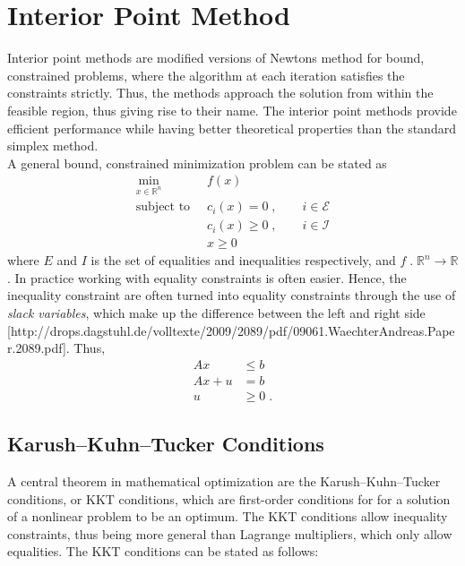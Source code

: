 \chapter{Interior Point Method}
Interior point methods are modified versions of Newtons method for bound, constrained problems, where the algorithm at each iteration satisfies the constraints strictly. Thus, the methods approach the solution from within the feasible region, thus giving rise to their name. The interior point methods provide efficient performance while having better theoretical properties than the standard simplex method.\\

A general bound, constrained minimization problem can be stated as
\begin{align*}
	\min_{x \in \mathbb{R}^n} \;  & \; f(x) \\
	\text{subject to} \;  & \; c_i(x) = 0 \; , \qquad i \in \mathcal{E} \\
							& \; c_i(x) \geq 0  \; , \qquad  i \in \mathcal{I} \\
							& \; x \geq 0
\end{align*}
where $E$ and $I$ is the set of equalities and inequalities respectively, and $f \; . \; \mathbb{R}^n \to \mathbb{R}$.
In practice working with equality constraints is often easier. Hence, the inequality constraint are often turned into equality constraints through the use of \textit{slack variables}, which make up the difference between the left and right side [http://drops.dagstuhl.de/volltexte/2009/2089/pdf/09061.WaechterAndreas.Paper.2089.pdf]. Thus,
\begin{align*}
	A x & \leq b \\
	A x + u &= b \\
	u & \geq 0 \; .
\end{align*}
   

\section{Karush–Kuhn–Tucker Conditions}
A central theorem in mathematical optimization are the Karush–Kuhn–Tucker conditions, or KKT conditions, which are first-order conditions for for a solution of a nonlinear problem to be an optimum. The KKT conditions allow inequality constraints, thus being more general than Lagrange multipliers, which only allow equalities. The KKT conditions can be stated as follows:

